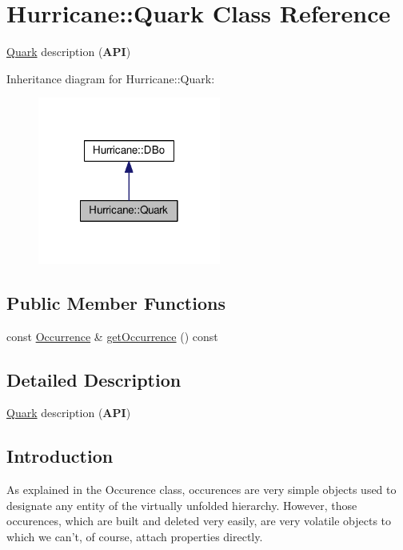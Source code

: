 \hypertarget{classHurricane_1_1Quark}{\section{Hurricane\-:\-:Quark Class Reference}
\label{classHurricane_1_1Quark}
}


\hyperlink{classHurricane_1_1Quark}{Quark} description ({\bfseries A\-P\-I})  




Inheritance diagram for Hurricane\-:\-:Quark\-:\nopagebreak
\begin{figure}[H]
\begin{center}
\leavevmode
\includegraphics[width=170pt]{classHurricane_1_1Quark__inherit__graph}
\end{center}
\end{figure}
\subsection*{Public Member Functions}
\begin{DoxyCompactItemize}
\item 
const \hyperlink{classHurricane_1_1Occurrence}{Occurrence} \& \hyperlink{classHurricane_1_1Quark_afcc704c57f9ecda5dccbb96abc5d0357}{get\-Occurrence} () const 
\end{DoxyCompactItemize}


\subsection{Detailed Description}
\hyperlink{classHurricane_1_1Quark}{Quark} description ({\bfseries A\-P\-I}) 

\hypertarget{classHurricane_1_1Quark_secQuarkIntro}{}\subsection{Introduction}\label{classHurricane_1_1Quark_secQuarkIntro}
As explained in the Occurence class, occurences are very simple objects used to designate any entity of the virtually unfolded hierarchy. However, those occurences, which are built and deleted very easily, are very volatile objects to which we can't, of course, attach properties directly.

